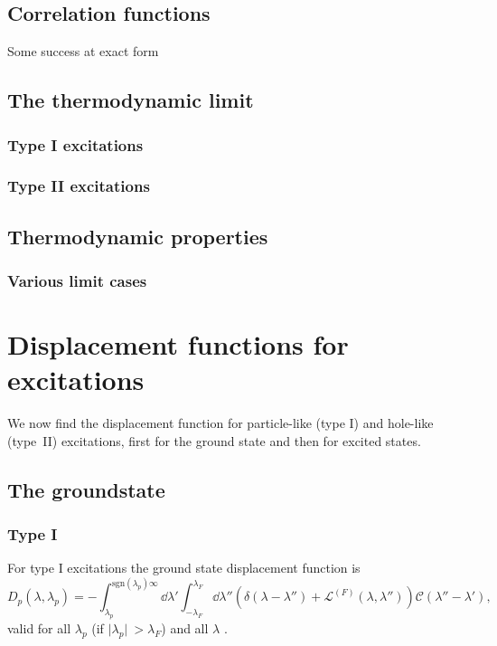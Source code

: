 \documentclass[11pt, a4paper,draft]{report} %
\newcommand{\inversetruncc}{\mathcal{L}}
\newcommand{\kernel}{\mathcal{C}}
\begin{document}
\subsection{Correlation functions}
Some success at exact form \cite{Nardis2016}
\cite{slavnov89_calcul_scalar_produc_wave_funct}
\cite{slavnov90_noneq_time_curren_correl_funct}

\subsection{The thermodynamic limit}

\subsubsection{Type I excitations}

\subsubsection{Type II excitations}

\subsection{Thermodynamic properties}

\subsubsection{Various limit cases}


\section{Displacement functions for excitations}
We now find the displacement function for particle-like (type I) and hole-like (type~II) excitations, first for the ground state and then for excited states.

\subsection{The groundstate}
\subsubsection{Type I}
For type I excitations the ground state displacement function is 
\begin{equation}\label{eq:particledisplacement}
	D_p(\lambda, \lambda_p) = - \int_{\lambda_p}^{\textrm{sgn}(\lambda_p)\infty} \dd \lambda' \int_{-\lambda_F}^{\lambda_F} \dd  \lambda'' \left(\delta(\lambda-\lambda'') + \inversetruncc^{(F)}(\lambda,\lambda'') \right)\kernel(\lambda''-\lambda'),
\end{equation}
valid for all \(\lambda_p\) (if \(\lvert \lambda_p \rvert\ > \lambda_F\)) and all \(\lambda\) \cite{tofind}.
\end{document}
